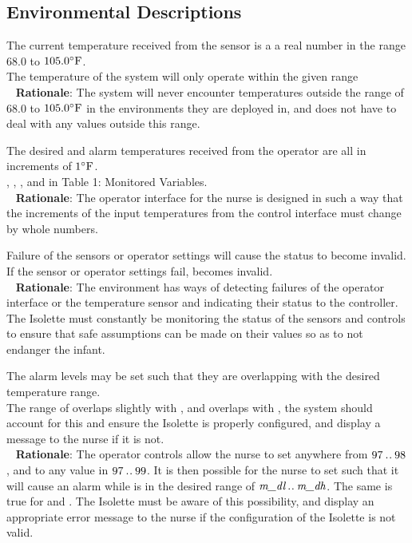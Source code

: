 \subsection{Environmental Descriptions}
{The current temperature received from the sensor is a a real number in the range $68.0$ to $105.0 ^{\circ}\mathrm{F}$.\\}
{The temperature of the system  will only operate within the given range\\~}
\label{E1}
\noindent \textbf{Rationale}: The system will never encounter temperatures outside the range of $68.0$ to $105.0 ^{\circ}\mathrm{F}$ in the environments they are deployed in, and does not have to deal with any values outside this range.

{The desired and alarm temperatures received from the operator are all in increments of $1 ^{\circ}\mathrm{F}$.\\}
{ , , , and  in Table 1: Monitored Variables.\\~}
\label{E2}
\noindent \textbf{Rationale}: The operator interface for the nurse is designed in such a way that the increments of the input temperatures from the control interface must change by whole numbers.

{Failure of the sensors or operator settings will cause the status to become invalid.\\}
{If the sensor or operator settings fail,  becomes invalid.\\~}
\label{E3}
\noindent \textbf{Rationale}: The environment has ways of detecting failures of the operator interface or the temperature sensor and indicating their status to the controller. The Isolette must constantly be monitoring the status of the sensors and controls to ensure that safe assumptions can be made on their values so as to not endanger the infant.

{The alarm levels may be set such that they are overlapping with the desired temperature range. \\}
{The range of  overlaps slightly with , and  overlaps with , the system should account for this and ensure the Isolette is properly configured, and display a message to the nurse if it is not.\\~}
\label{E4}
\noindent \textbf{Rationale}: The operator controls allow the nurse to set  anywhere from $97 \mathbin{.\mkern1mu.} 98$, and  to any value in $97 \mathbin{.\mkern1mu.} 99$. It is then possible for the nurse to set  such that it will cause an alarm while  is in the desired range of $\textit{m\_dl} \mathbin{.\mkern1mu.} \textit{m\_dh}$. The same is true for  and . The Isolette must be aware of this possibility, and display an appropriate error message to the nurse if the configuration of the Isolette is not valid.